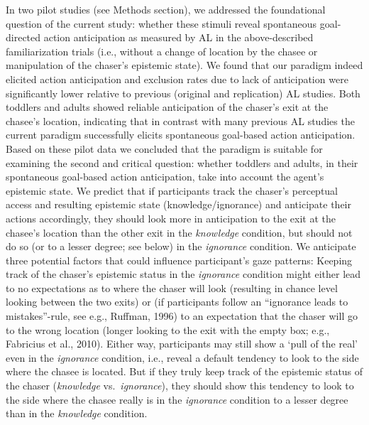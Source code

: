 \documentclass[
  english,
  man,floatsintext]{apa6}
\begin{document}
In two pilot studies (see Methods section), we addressed the foundational question of the current study: whether these stimuli reveal spontaneous goal-directed action anticipation as measured by AL in the above-described familiarization trials (i.e., without a change of location by the chasee or manipulation of the chaser's epistemic state). We found that our paradigm indeed elicited action anticipation and exclusion rates due to lack of anticipation were significantly lower relative to previous (original and replication) AL studies. Both toddlers and adults showed reliable anticipation of the chaser's exit at the chasee's location, indicating that in contrast with many previous AL studies the current paradigm successfully elicits spontaneous goal-based action anticipation. Based on these pilot data we concluded that the paradigm is suitable for examining the second and critical question: whether toddlers and adults, in their spontaneous goal-based action anticipation, take into account the agent's epistemic state.
We predict that if participants track the chaser's perceptual access and resulting epistemic state (knowledge/ignorance) and anticipate their actions accordingly, they should look more in anticipation to the exit at the chasee's location than the other exit in the \emph{knowledge} condition, but should not do so (or to a lesser degree; see below) in the \emph{ignorance} condition. We anticipate three potential factors that could influence participant's gaze patterns: Keeping track of the chaser's epistemic status in the \emph{ignorance} condition might either lead to no expectations as to where the chaser will look (resulting in chance level looking between the two exits) or (if participants follow an ``ignorance leads to mistakes''-rule, see e.g., Ruffman, 1996) to an expectation that the chaser will go to the wrong location (longer looking to the exit with the empty box; e.g., Fabricius et al., 2010). Either way, participants may still show a `pull of the real' even in the \emph{ignorance} condition, i.e., reveal a default tendency to look to the side where the chasee is located. But if they truly keep track of the epistemic status of the chaser (\emph{knowledge} vs.~\emph{ignorance}), they should show this tendency to look to the side where the chasee really is in the \emph{ignorance} condition to a lesser degree than in the \emph{knowledge} condition.
\end{document}
